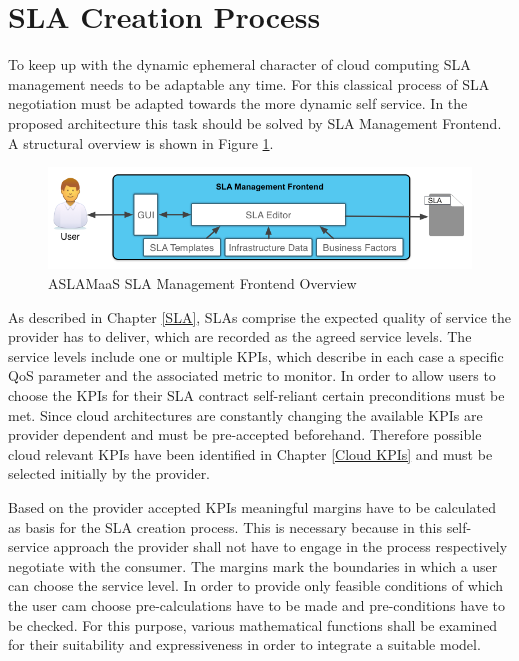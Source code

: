 \section{SLA Creation Process} \label{SLA creation}
To keep up with the dynamic ephemeral character of cloud computing SLA management needs to be adaptable any time. For this classical process of SLA negotiation must be adapted towards the more dynamic self service. In the proposed architecture this task should be solved by SLA Management Frontend. A structural overview is shown in Figure \ref{fig_Editor}.

\begin{figure}[!ht]
\centering
\includegraphics[width=5.3in]{chapters/chapter4/fig/Editor.PNG}
\caption{ASLAMaaS SLA Management Frontend Overview}
\label{fig_Editor}
\end{figure}

As described in Chapter \ref{SLA}, SLAs comprise the expected quality of service the provider has to deliver, which are recorded as the agreed service levels. The service levels include one or multiple KPIs, which describe in each case a specific QoS parameter and the associated metric to monitor. In order to allow users to choose the KPIs for their SLA contract self-reliant certain preconditions must be met. Since cloud architectures are constantly changing the available KPIs are provider dependent and must be pre-accepted beforehand. Therefore possible cloud relevant KPIs have been identified in Chapter \ref{Cloud KPIs} and must be selected initially by the provider.

Based on the provider accepted KPIs meaningful margins have to be calculated as basis for the SLA creation process. This is necessary because in this self-service approach the provider shall not have to engage in the process respectively negotiate with the consumer. The margins mark the boundaries in which a user can choose the service level. In order to provide only feasible conditions of which the user cam choose pre-calculations have to be made and pre-conditions have to be checked. For this purpose, various mathematical functions shall be examined for their suitability and expressiveness in order to integrate a suitable model.

